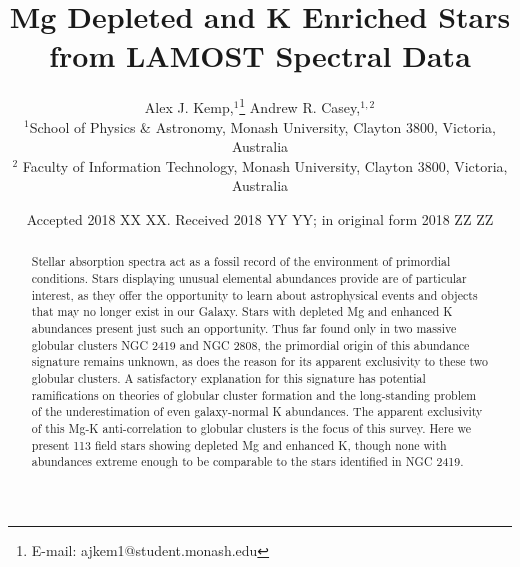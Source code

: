 \documentclass[a4paper,fleqn,usenatbib]{mnras}
\title[Short title, max. 45 characters]{Mg Depleted and K Enriched Stars from LAMOST Spectral Data}
\author[Kemp et al.]{
Alex J. Kemp,$^{1}$\thanks{E-mail: ajkem1@student.monash.edu}
Andrew R. Casey,$^{1,2}$
\\
$^{1}$School of Physics \& Astronomy, Monash University, Clayton 3800, Victoria, Australia\\
$^{2}$ Faculty of Information Technology, Monash University, Clayton 3800, Victoria, Australia\\
}
\date{Accepted 2018 XX XX. Received 2018 YY YY; in original form 2018 ZZ ZZ}
\begin{document}
\label{firstpage}
\pagerange{\pageref{firstpage}--\pageref{lastpage}}
\maketitle

\begin{abstract}

Stellar absorption spectra act as a fossil record of the environment of primordial conditions. Stars displaying unusual elemental abundances provide are of particular interest, as they offer the opportunity to learn about astrophysical events and objects that may no longer exist in our Galaxy. Stars with depleted Mg and enhanced K abundances present just such an opportunity. Thus far found only in two massive globular clusters NGC 2419 and NGC 2808, the primordial origin of this abundance signature remains unknown, as does the reason for its apparent exclusivity to these two globular clusters. A satisfactory explanation for this signature has potential ramifications on theories of globular cluster formation and the long-standing problem of the underestimation of even galaxy-normal K abundances. The apparent exclusivity of this Mg-K anti-correlation to globular clusters is the focus of this survey. Here we present 113 field stars showing depleted Mg and enhanced K, though none with abundances extreme enough to be comparable to the stars identified in NGC 2419.


\end{abstract}
\end{document}
